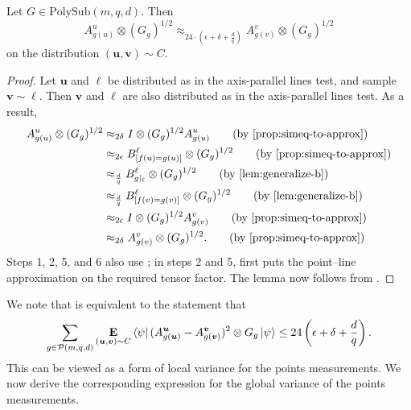 \documentclass[11pt]{article}
\theoremstyle{definition}
\newcommand{\E}{\mathop{\bf E\/}}
\newcommand{\eps}{\epsilon}
\newcommand{\calP}{\mathcal{P}}
\newcommand{\bell}{\boldsymbol{\ell}}
\newcommand{\bu}{\boldsymbol{u}}
\newcommand{\bv}{\boldsymbol{v}}
\newcommand{\polyfunc}[3]{\calP(#1, #2, #3)}
\newcommand{\polysub}[3]{\mathrm{PolySub}(#1, #2, #3)}
\begin{document}
\begin{lemma}\label{lem:local-variance-of-points}
Let $G \in \polysub{m}{q}{d}$.  Then
\begin{equation}\label{eq:local-variance-of-points-equation}
A^u_{g(u)} \otimes (G_g)^{1/2} \approx_{24\cdot(\eps + \delta + \frac{d}{q})} A^v_{g(v)} \otimes (G_g)^{1/2}
\end{equation}
on the distribution $(\bu, \bv) \sim C$.
\end{lemma}
\begin{proof}
Let $\bu$ and $\bell$ be distributed as in the axis-parallel lines test,
and sample $\bv \sim \bell$.
Then $\bv$ and $\bell$ are also distributed as in the axis-parallel lines test.
As a result,
\begin{align*}
A^u_{g(u)} \otimes (G_g)^{1/2}
&\approx_{2\delta} I \otimes (G_g)^{1/2} A^u_{g(u)}\tag{by \Cref{prop:simeq-to-approx}}\\
&\approx_{2\eps} B^\ell_{[f(u) = g(u)]} \otimes (G_g)^{1/2}\tag{by \Cref{prop:simeq-to-approx}}\\
&\approx_{\frac{d}{q}} B^\ell_{g|_{\ell}} \otimes (G_g)^{1/2}\tag{by \Cref{lem:generalize-b}}\\
&\approx_{\frac{d}{q}} B^\ell_{[f(v) = g(v)]} \otimes (G_g)^{1/2}\tag{by \Cref{lem:generalize-b}}\\
&\approx_{2\eps} I \otimes (G_g)^{1/2} A^v_{g(v)} \tag{by \Cref{prop:simeq-to-approx}}\\
&\approx_{2\delta} A^v_{g(v)} \otimes (G_g)^{1/2}.\tag{by \Cref{prop:simeq-to-approx}}
\end{align*}
Steps 1, 2, 5, and 6 also use
; in
steps 2 and 5,  first puts the
point--line approximation on the required tensor factor.
The lemma now follows from .
\end{proof}

We note that  is equivalent to the statement that
\begin{equation}\label{eq:equivalent-local-variance}
\sum_{g \in \polyfunc{m}{q}{d}}\E_{(\bu, \bv) \sim C} \bra{\psi} (A^{\bu}_{g(\bu)}  - A^{\bv}_{g(\bv)})^2 \otimes G_g \ket{\psi}
\leq 24\left(\eps + \delta + \frac{d}{q}\right).
\end{equation}
This can be viewed as a form of local variance for the points measurements.
We now derive the corresponding expression for the global variance of the points measurements.
\end{document}
